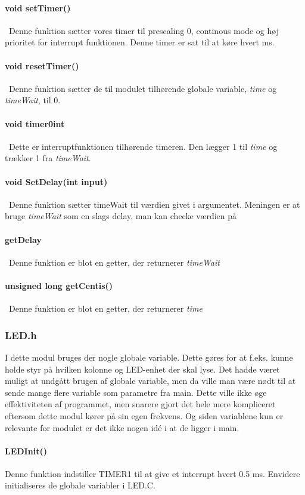 \paragraph{void setTimer()}\
Denne funktion sætter vores timer til prescaling 0, continous mode og høj prioritet for interrupt funktionen. Denne timer er sat til at køre hvert ms.
\paragraph{void resetTimer()}\
Denne funktion sætter de til modulet tilhørende globale variable, \textit{time} og \textit{timeWait}, til 0.
\paragraph{void timer0int}\
Dette er interruptfunktionen tilhørende timeren. Den lægger 1 til \textit{time} og trækker 1 fra \textit{timeWait}. 
\paragraph{void SetDelay(int input)}\
Denne funktion sætter timeWait til værdien givet i argumentet. Meningen er at bruge \textit{timeWait} som en slags delay, man kan checke værdien på
\paragraph{getDelay}\
Denne funktion er blot en getter, der returnerer \textit{timeWait}
\paragraph{unsigned long getCentis()}\
Denne funktion er blot en getter, der returnerer \textit{time}
\subsubsection{LED.h}
I dette modul bruges der nogle globale variable. Dette gøres for at f.eks. kunne holde styr på hvilken kolonne og LED-enhet der skal lyse. Det hadde været muligt at undgått brugen af globale variable, men da ville man være nødt til at sende mange flere variable som parametre fra main. Dette ville ikke øge effektiviteten af programmet, men snarere gjort det hele mere kompliceret eftersom dette modul kører på sin egen frekvens. Og siden variablene kun er relevante for modulet er det ikke nogen idé i at de ligger i main.

\paragraph{LEDInit()}
Denne funktion indstiller TIMER1 til at give et interrupt hvert 0.5 ms. Envidere initialiseres de globale variabler i LED.C.

